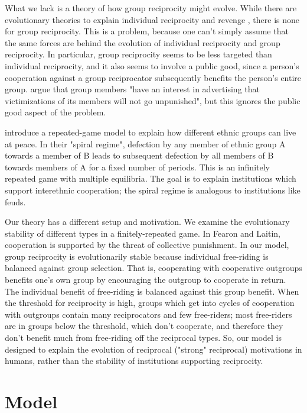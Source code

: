 \documentclass[12pt,a4paper]{article}
\begin{document}
What we lack is a theory of how group reciprocity might evolve. While there
are evolutionary theories to explain individual reciprocity and revenge
\citep{mccullough2013cognitive}, there is none for group reciprocity. This is
a problem, because one can't simply assume that the same forces are behind the evolution of individual reciprocity and group reciprocity. In particular, group
reciprocity seems to be less targeted than individual reciprocity, and it also
seems to involve a public good, since a person's cooperation against a group
reciprocator subsequently benefits the person's entire group.
\citet{petersen2010evolutionary} argue that group members "have an interest in
advertising that victimizations of its members will not go unpunished", but this
ignores the public good aspect of the problem.

\citet{fearon1996explaining} introduce a repeated-game model to explain how
different ethnic groups can live at peace. In their "spiral regime", defection
by any member of ethnic group A towards a member of B leads to subsequent 
defection by all members of B towards members of A for a fixed number of periods.
This is an infinitely repeated game with multiple equilibria. The goal is to explain
institutions which support interethnic cooperation; the spiral regime is analogous
to institutions like feuds.

Our theory has a different setup and motivation. We examine the evolutionary
stability of different types in a finitely-repeated game. In Fearon and Laitin,
cooperation is supported by the threat of collective punishment. In our model,
group  reciprocity is evolutionarily stable because individual free-riding is
balanced against group selection. That is, cooperating with cooperative outgroups
benefits one's own group by encouraging the outgroup to cooperate in return. The 
individual benefit of free-riding is balanced against this group benefit. When 
the threshold for reciprocity is high, groups which get into cycles of cooperation
with outgroups contain many reciprocators and few free-riders; most free-riders 
are in groups below the threshold, which don't cooperate, and therefore they 
don't benefit much from free-riding off the reciprocal types. So, our model
is designed to explain the evolution of reciprocal ("strong" reciprocal) motivations in humans, rather than the stability of institutions supporting reciprocity.

\section{Model}
\end{document}
